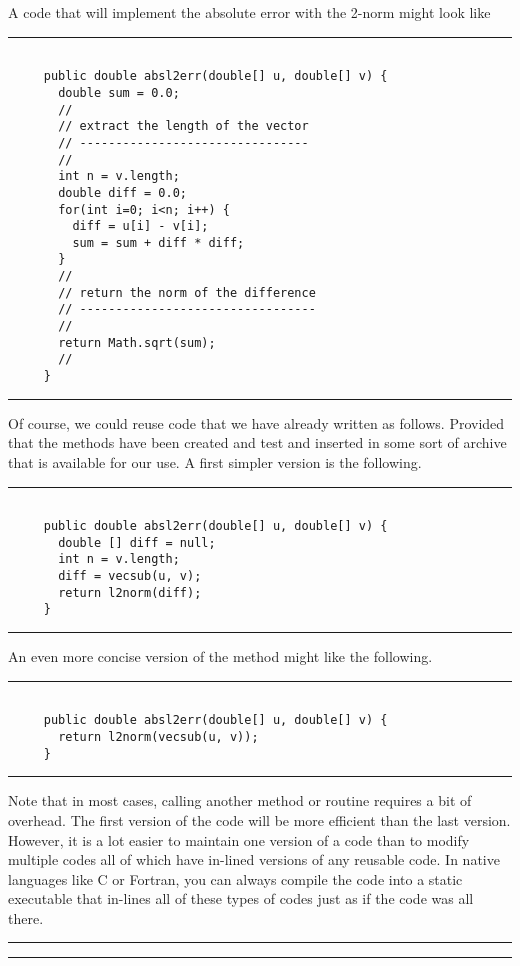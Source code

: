\documentclass[10pt,fleqn]{article}
\begin{document}
A code that will implement the absolute error with the 2-norm might look like
\vskip0.1in\hrule\vskip0.1in
\begin{verbatim}

     public double absl2err(double[] u, double[] v) {
       double sum = 0.0;
       //
       // extract the length of the vector
       // --------------------------------
       //
       int n = v.length;
       double diff = 0.0;
       for(int i=0; i<n; i++) {
         diff = u[i] - v[i];
         sum = sum + diff * diff;
       }
       //
       // return the norm of the difference
       // ---------------------------------
       //
       return Math.sqrt(sum);
       //
     }

\end{verbatim}
\vskip0.1in\hrule\vskip0.1in
Of course, we could reuse code that we have already written as follows. Provided
that the methods have been created and test and inserted in some sort of archive
that is available for our use. A first simpler version is the following.
\vskip0.1in\hrule\vskip0.1in
\begin{verbatim}

     public double absl2err(double[] u, double[] v) {
       double [] diff = null;
       int n = v.length;
       diff = vecsub(u, v);
       return l2norm(diff);
     }

\end{verbatim}
\vskip0.1in\hrule\vskip0.1in
An even more concise version of the method might like the following.
\vskip0.1in\hrule\vskip0.1in
\begin{verbatim}

     public double absl2err(double[] u, double[] v) {
       return l2norm(vecsub(u, v));
     }

\end{verbatim}
\vskip0.1in\hrule\vskip0.1in
Note that in most cases, calling another method or routine requires a bit of
overhead. The first version of the code will be more efficient than the last
version. However, it is a lot easier to maintain one version of a code than to
modify multiple codes all of which have in-lined versions of any reusable code.
In native languages like C or Fortran, you can always compile the code into a
static executable that in-lines all of these types of codes just as if the code
was all there.
\vskip0.1in\hrule\vskip0.1in
\newpage
\vskip0.1in\hrule\vskip0.1in
\end{document}
